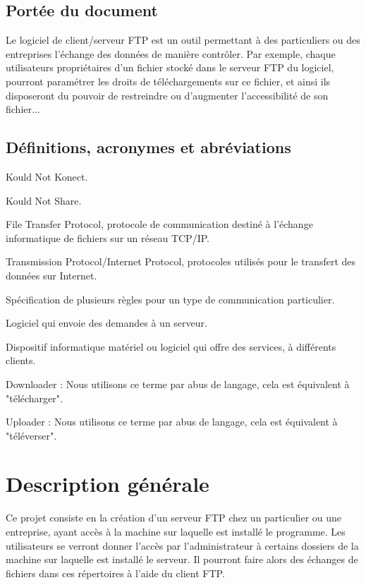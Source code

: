 \documentclass[10pt,a4paper]{report}
\begin{document}
\subsection{Portée du document}
Le logiciel de client/serveur FTP est un outil permettant à des particuliers ou des entreprises l'échange des données de manière contrôler. Par exemple, chaque utilisateurs propriétaires d'un fichier stocké dans le serveur FTP du logiciel, pourront paramétrer les droits de téléchargements sur ce fichier, et ainsi ils disposeront du pouvoir de restreindre ou d'augmenter l'accessibilité de son fichier...


\subsection{Définitions, acronymes et abréviations}
\begin{description}
\item[KNK] Kould Not Konect.
\item[KNS] Kould Not Share.
\item[FTP] File Transfer Protocol, protocole de communication destiné à l'échange informatique de fichiers sur un réseau TCP/IP.
\item[TCP/IP] Transmission Protocol/Internet Protocol, protocoles utilisés pour le transfert des données sur Internet.
\item[Protocole] Spécification de plusieurs règles pour un type de communication particulier.
\item[Client] Logiciel qui envoie des demandes à un serveur.
\item[Serveur] Dispositif informatique matériel ou logiciel qui offre des services, à différents clients.
\item Downloader : Nous utilisons ce terme par abus de langage, cela est équivalent à "télécharger".
\item Uploader : Nous utilisons ce terme par abus de langage, cela est équivalent à "téléverser".
\end{description}


\section{Description générale}

Ce projet consiste en la création d'un serveur FTP chez un particulier ou une entreprise, ayant accès à la machine sur laquelle est installé le programme. Les utilisateurs se verront donner l'accès par l'administrateur à certains dossiers de la machine sur laquelle est installé le serveur. Il pourront faire alors des échanges de fichiers dans ces répertoires à l'aide du client FTP.
\end{document}
